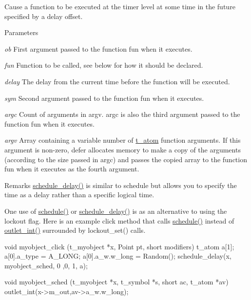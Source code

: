Cause a function to be executed at the timer level at some time in the future specified by a delay offset. 
\begin{DoxyParams}{Parameters}
\item[{\em ob}]First argument passed to the function fun when it executes. \item[{\em fun}]Function to be called, see below for how it should be declared. \item[{\em delay}]The delay from the current time before the function will be executed. \item[{\em sym}]Second argument passed to the function fun when it executes. \item[{\em argc}]Count of arguments in argv. argc is also the third argument passed to the function fun when it executes. \item[{\em argv}]Array containing a variable number of \hyperlink{structt__atom}{t\_\-atom} function arguments. If this argument is non-\/zero, defer allocates memory to make a copy of the arguments (according to the size passed in argc) and passes the copied array to the function fun when it executes as the fourth argument.\end{DoxyParams}
\begin{DoxyRemark}{Remarks}
\hyperlink{group__threading_gaa9b66fe2fc601f110bd962a622f1d5a0}{schedule\_\-delay()} is similar to schedule but allows you to specify the time as a delay rather than a specific logical time.
\end{DoxyRemark}
One use of \hyperlink{group__threading_ga1eb8ec7623f0806dd079d7be708c19a8}{schedule()} or \hyperlink{group__threading_gaa9b66fe2fc601f110bd962a622f1d5a0}{schedule\_\-delay()} is as an alternative to using the lockout flag. Here is an example click method that calls \hyperlink{group__threading_ga1eb8ec7623f0806dd079d7be708c19a8}{schedule()} instead of \hyperlink{group__inout_ga0b2b38216f2f4dba486bfcd2273f255e}{outlet\_\-int()} surrounded by lockout\_\-set() calls.


\begin{DoxyCode}
    void myobject_click (t_myobject *x, Point pt, short modifiers) 
    { 
        t_atom a[1]; 
        a[0].a_type = A_LONG; 
        a[0].a_w.w_long = Random(); 
        schedule_delay(x, myobject_sched, 0 ,0, 1, a); 
    } 

    void myobject_sched (t_myobject *x, t_symbol *s, short ac, t_atom *av) 
    { 
        outlet_int(x->m_out,av->a_w.w_long); 
    } 
\end{DoxyCode}


